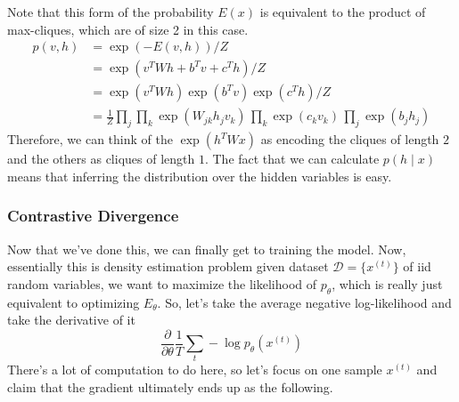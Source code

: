   Note that this form of the probability $E(x)$ is equivalent to the product of max-cliques, which are of size 2 in this case. 
  \begin{align}
    p(v, h) & = \exp(-E(v, h)) / Z \\ 
            & = \exp(v^T W h + b^T v + c^T h) / Z \\
            & = \exp(v^T W h) \exp(b^T v) \exp (c^T h) / Z  \\
            & = \frac{1}{Z} \prod_j \prod_k \exp(W_{jk} h_j v_k) \, \prod_k \exp(c_k v_k) \, \prod_j \exp(b_j h_j)
  \end{align}
  Therefore, we can think of the $\exp(h^T W x)$ as encoding the cliques of length $2$ and the others as cliques of length $1$. The fact that we can calculate $p(h \mid x)$ means that inferring the distribution over the hidden variables is easy. 

  \subsubsection{Contrastive Divergence}

    Now that we've done this, we can finally get to training the model. Now, essentially this is density estimation problem given dataset $\mathcal{D} = \{x^{(t)}\}$ of iid random variables, we want to maximize the likelihood of $p_{\theta}$, which is really just equivalent to optimizing $E_{\theta}$. So, let's take the average negative log-likelihood and take the derivative of it
    \begin{equation}
      \frac{\partial}{\partial \theta} \frac{1}{T} \sum_t - \log p_{\theta} (x^{(t)})
    \end{equation}
    There's a lot of computation to do here, so let's focus on one sample $x^{(t)}$ and claim that the gradient ultimately ends up as the following. 


